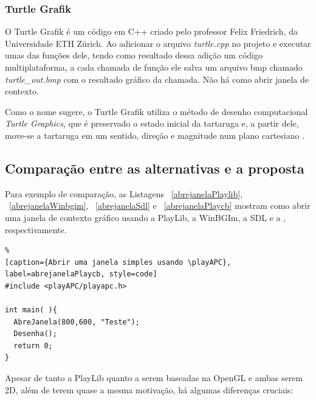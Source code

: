 
\subsubsection{Turtle Grafik}
O Turtle Grafik é um código em C++ criado pelo professor Felix Friedrich, da Universidade ETH Zürich. Ao adicionar o arquivo \emph{turtle.cpp} no projeto e executar umas das funções dele, tendo como resultado dessa adição um código multiplataforma, a cada chamada de função ele salva um arquivo bmp chamado \emph{turtle\_out.bmp} com o resultado gráfico da chamada. Não há como abrir janela de contexto.

Como o nome sugere, o Turtle Grafik utiliza o método de desenho computacional \emph{Turtle Graphics}, que é preservado o estado inicial da tartaruga e, a partir dele, move-se a tartaruga em um sentido, direção e magnitude num plano cartesiano \cite{pybookturtle}.

 \subsection{Comparação entre as alternativas e a proposta}
 Para  exemplo  de  comparação,  as  Listagens ~\ref{abrejanelaPlaylib},
 ~\ref{abrejanelaWinbgim}, ~\ref{abrejanelaSdl} e ~\ref{abrejanelaPlaycb}  mostram como  abrir uma
 janela  de contexto gráfico  usando a  PlayLib, a WinBGIm, a SDL e a \playAPC{},
 respectivamente.

\begin{minipage}{\linewidth}
\begin{lstlisting}%
[caption={Abrir uma janela simples usando \playAPC}, 
label=abrejanelaPlaycb, style=code]
#include <playAPC/playapc.h>
  
int main( ){
  AbreJanela(800,600, "Teste");
  Desenha();
  return 0;
}
\end{lstlisting}
\end{minipage}

 \normalsize  Apesar  de  tanto  a  PlayLib quanto  a  \playAPC{}  serem
 baseadas  na OpenGL  e ambas  serem 2D,  além de  terem quase  a mesma
 motivação, há algumas diferenças cruciais:

